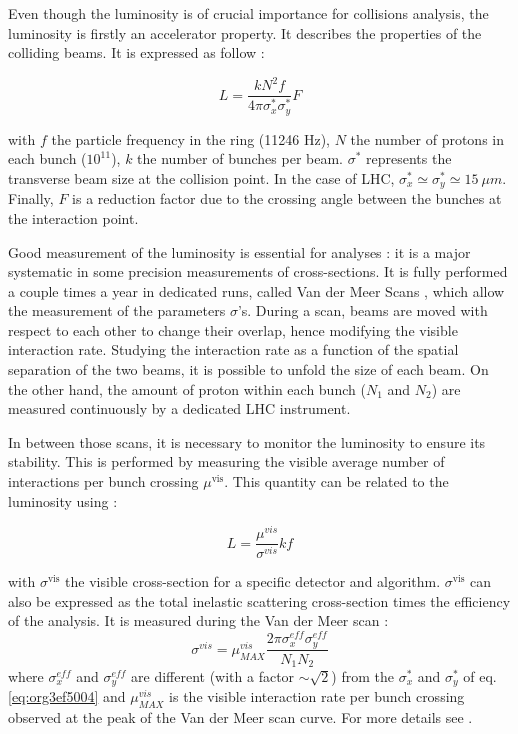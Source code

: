 Even though the luminosity is of crucial importance for collisions analysis, the luminosity is firstly an accelerator property.
It describes the properties of the colliding beams.
It is expressed as follow :

\begin{equation}
\label{eq:org3ef5004}
L=\frac{kN^2f}{4\pi\sigma_x^*\sigma_y^*}F
\end{equation}

with $f$ the particle frequency in the ring (11246 Hz), $N$ the number of protons in each bunch ($10^{11}$), $k$ the number of bunches per beam.
$\sigma^*$ represents the transverse beam size at the collision point.
In the case of LHC, $\sigma_x^*\simeq\sigma_y^*\simeq15\ \mu m$.
Finally, $F$ is a reduction factor due to the crossing angle between the bunches at the interaction point.


Good measurement of the luminosity is essential for analyses : it is a major systematic in some precision measurements of cross-sections.
It is fully performed a couple times a year in dedicated runs, called Van der Meer Scans \cite{CERN-ISR-PO-68-31}, which allow the measurement of the parameters $\sigma$'s.
During a scan, beams are moved with respect to each other to change their overlap, hence modifying the visible interaction rate.
Studying the interaction rate as a function of the spatial separation of the two beams, it is possible to unfold the size of each beam.
On the other hand, the amount of proton within each bunch ($N_1$ and $N_2$) are measured continuously by a dedicated LHC instrument.

In between those scans, it is necessary to monitor the luminosity to ensure its stability.
This is performed by measuring the visible average number of interactions per bunch crossing $\mu^{\text{vis}}$.
This quantity can be related to the luminosity using :

\begin{equation}
L = \frac{\mu^{vis}}{\sigma^{vis}} k f
\end{equation}

with $\sigma^{\text{vis}}$ the visible cross-section for a specific detector and algorithm.
$\sigma^{\text{vis}}$ can also be expressed as the total inelastic scattering cross-section times the efficiency of the analysis.
It is measured during the Van der Meer scan :
\begin{equation}
\sigma^{vis} = \mu^{vis}_{MAX} \frac{2\pi \sigma_x^{eff}\sigma_y^{eff}}{N_1N_2}
\end{equation}
where $\sigma_x^{eff}$ and $\sigma_y^{eff}$ are different (with a factor $\sim\sqrt{2}$) from the $\sigma_x^*$ and $\sigma_y^*$ of eq. \ref{eq:org3ef5004} and $\mu^{vis}_{MAX}$ is the visible interaction rate per bunch crossing observed at the peak of the Van der Meer scan curve.
For more details see \cite{CERN-THESIS-2010-139}.

